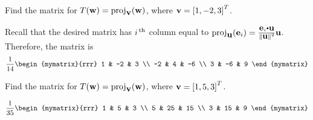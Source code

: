 \begin{ex}
  Find the matrix for
  $T(\vect{w}) = \proj_{\vect{v}}(\vect{w})$, where
  $\mbox{\bf v}=\left[1, -2, 3\right]^{T}$.
  \begin{sol}
    Recall that the desired matrix has $i^{\,\rm th}$ column equal to
    $\proj_{\vect{u}}(\vect{e}_{i}) =
    \frac{\vect{e}_i\dotprod\vect{u}}{\norm{\vect{u}}^{2}}\vect{u}$.
    Therefore, the matrix is
    \begin{equation*}
      \frac{1}{14}\begin{mymatrix}{rrr}
        1 & -2 & 3 \\
        -2 & 4 & -6 \\
        3 & -6 & 9
      \end{mymatrix}
    \end{equation*}
  \end{sol}
\end{ex}

\begin{ex}
  Find the matrix for
  $T(\vect{w}) = \proj_{\vect{v}}(\vect{w})$, where
  $\mbox{\bf v}=\left[1,5,3\right]^{T}$.
  \begin{sol}
    \begin{equation*}
      \frac{1}{35}\begin{mymatrix}{rrr}
        1 & 5 & 3 \\
        5 & 25 & 15 \\
        3 & 15 & 9
      \end{mymatrix}
    \end{equation*}
  \end{sol}
\end{ex}

